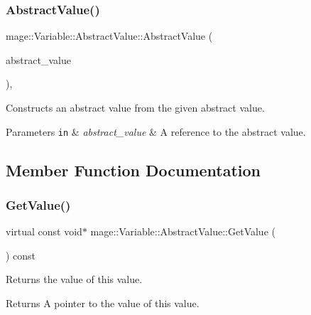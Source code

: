 \subsubsection{\texorpdfstring{Abstract\+Value()}{AbstractValue()}\hspace{0.1cm}{\footnotesize\ttfamily [3/3]}}
{\footnotesize\ttfamily mage\+::\+Variable\+::\+Abstract\+Value\+::\+Abstract\+Value (\begin{DoxyParamCaption}\item[{\hyperlink{structmage_1_1_variable_1_1_abstract_value}{Abstract\+Value} \&\&}]{abstract\+\_\+value }\end{DoxyParamCaption})\hspace{0.3cm}{\ttfamily [protected]}, {\ttfamily [default]}}

Constructs an abstract value from the given abstract value.


\begin{DoxyParams}[1]{Parameters}
\mbox{\tt in}  & {\em abstract\+\_\+value} & A reference to the abstract value. \\
\hline
\end{DoxyParams}


\subsection{Member Function Documentation}
\hypertarget{structmage_1_1_variable_1_1_abstract_value_aede2a77b571b80794a4254e34144f4c1}{}\label{structmage_1_1_variable_1_1_abstract_value_aede2a77b571b80794a4254e34144f4c1} 
\subsubsection{\texorpdfstring{Get\+Value()}{GetValue()}}
{\footnotesize\ttfamily virtual const void$\ast$ mage\+::\+Variable\+::\+Abstract\+Value\+::\+Get\+Value (\begin{DoxyParamCaption}{ }\end{DoxyParamCaption}) const\hspace{0.3cm}{\ttfamily [pure virtual]}}

Returns the value of this value.

\begin{DoxyReturn}{Returns}
A pointer to the value of this value. 
\end{DoxyReturn}



